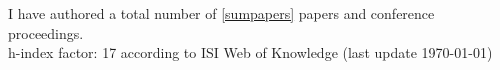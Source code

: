 \begin{publications}
I have authored a total number of \ref{sumpapers} papers and
conference proceedings. \\
h-index factor: 17 according to ISI Web of Knowledge (last update \today)

\end{publications}
